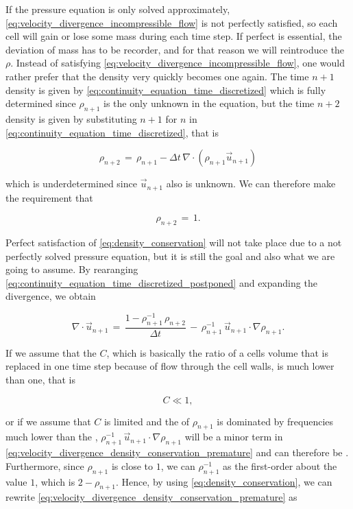 If the pressure equation is only solved approximately, \eqref{eq:velocity_divergence_incompressible_flow} is not perfectly satisfied, so each cell will gain or lose some mass during each time step. If perfect  is essential, the deviation of mass has to be recorder, and for that reason we will reintroduce the  $\rho$. Instead of satisfying \eqref{eq:velocity_divergence_incompressible_flow}, one would rather prefer that the density very quickly becomes one again. The time $n+1$ density is given by \eqref{eq:continuity_equation_time_discretized} which is fully determined since $\rho_{n+1}$ is the only unknown in the equation, but the time $n+2$ density is given by substituting $n+1$ for $n$ in \eqref{eq:continuity_equation_time_discretized}, that is

\begin{equation} \label{eq:continuity_equation_time_discretized_postponed}
\rho_{n+2} \,=\, \rho_{n+1} - \Delta t\,\nabla\cdot(\rho_{n+1}\vec{u}_{n+1})
\end{equation}

which is underdetermined since $\vec{u}_{n+1}$ also is unknown. We can therefore make the requirement that

\begin{equation} \label{eq:density_conservation}
\rho_{n+2} \,=\, 1.
\end{equation}

Perfect satisfaction of \eqref{eq:density_conservation} will not take place due to a not perfectly solved pressure equation, but it is still the goal and also what we are going to assume. By rearanging \eqref{eq:continuity_equation_time_discretized_postponed} and expanding the divergence, we obtain

\begin{equation} \label{eq:velocity_divergence_density_conservation_premature}
\nabla\cdot\vec{u}_{n+1} \,=\, \frac{1-\rho_{n+1}^{-1}\,\rho_{n+2}}{\Delta t} \,-\, \rho_{n+1}^{-1}\,\vec{u}_{n+1}\cdot\nabla\rho_{n+1}.
\end{equation}

If we assume that the  $C$, which is basically the ratio of a cells volume that is replaced in one time step because of flow through the cell walls, is much lower than one, that is

\begin{equation}
C \ll 1,
\end{equation}

or if we assume that $C$ is limited and the \spectrum of $\rho_{n+1}$ is dominated by frequencies much lower than the , $\rho_{n+1}^{-1}\,\vec{u}_{n+1}\cdot\nabla\rho_{n+1}$ will be a minor term in \eqref{eq:velocity_divergence_density_conservation_premature} and can therefore be \neglected. Furthermore, since $\rho_{n+1}$ is close to $1$, we can \approximate $\rho_{n+1}^{-1}$ as the first-order  about the value $1$, which is $2-\rho_{n+1}$. Hence, by using \eqref{eq:density_conservation}, we can rewrite \eqref{eq:velocity_divergence_density_conservation_premature} as

